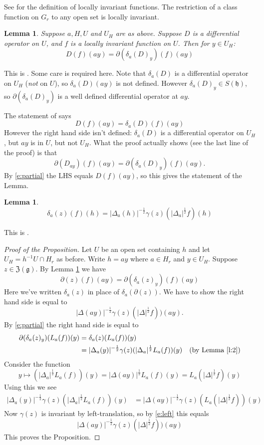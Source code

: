 \documentclass{article}
\newtheorem{lem}[thm]{Lemma}
\theoremstyle{definition}
\numberwithin{equation}{section}
\renewcommand{\-}{\hyp{}}
\newcommand{\inv}{^{-1}}
\newcommand{\z}{\mathfrak Z}
\newcommand{\g}{\mathfrak g}
\newcommand{\h}{\mathfrak h}
\begin{document}
See \cite[Section 8]{HC_inv_dist} for the definition of locally invariant functions.
The restriction of a class function on $G_r$ to any open set is locally invariant.

\begin{lem}
\label{l:1}
Suppose $a,H,U$ and $U_H$ are as above. 
Suppose $D$ is a differential operator on $U$, and $f$ is a locally invariant function on $U$.
Then for $y\in U_H$:
$$
D(f)(ay)=\partial(\delta_a(D)_y)(f)(ay)
$$
\end{lem}

This is \cite[Lemma 18]{HC_inv_eigen}. Some care is required here. Note that $\delta_a(D)$ is a differential operator on $U_H$ ({\it not} on $U$),
so $\delta_a(D)(ay)$ is not defined. However $\delta_a(D)_y\in S(\h)$,
so $\partial(\delta_a(D)_y)$ is a well defined differential operator at $ay$. 

The statement of \cite[Lemma 18]{HC_inv_eigen} says
$$
D(f)(ay)=\delta_a(D)(f)(ay)
$$
However the right hand side isn't defined: $\delta_a(D)$ is a differential operator on $U_H$, but $ay$ is in $U$, but not $U_H$.
What the proof actually shows (see the last line of the proof) is that 
$$
\partial(D_{ay})(f)(ay)=\partial(\delta_a(D)_y)(f)(ay).
$$
By \eqref{e:partial}
the LHS equals $D(f)(ay)$, so this gives the statement of the Lemma.


\begin{lem}
\label{l:2}
$$
\delta_a(z)(f)(h)=|\Delta_a(h)|^{-\frac12}\gamma(z)(|\Delta_a|^{\frac12}f)(h)
$$
\end{lem}
This is \cite[Lemma 13]{HC_inv_eigen}.

\begin{proof}[Proof of the Proposition]

Let $U$ be an open set containing $h$ and let $U_H=h\inv U\cap H_r$ as before. 
Write $h=ay$ where $a\in H_r$ and $y\in U_H$.
Suppose $z\in\z(\g)$. By  Lemma \ref{l:1} we have
$$
\partial(z)(f)(ay)=\partial(\delta_a(z)_y)(f)(ay)
$$
Here we've written $\delta_a(z)$ in place of $\delta_a(\partial(z))$.
We have to show the right hand side is equal to 
$$
|\Delta(ay)|^{-\frac12}\gamma(z)(|\Delta|^{\frac12}f))(ay).
$$
By \eqref{e:partial} the right hand side is equal to 
$$
\begin{aligned}
\partial(\delta_a(z)_y)(L_a(f))(y)&=\delta_a(z)(L_a(f))(y)\\
&=|\Delta_a(y)|^{-\frac12}\gamma(z)(|\Delta_a|^{\frac12}L_a(f))(y)\quad(\text{by Lemma \ref{l:2}})\\
\end{aligned}
$$
Consider the function
$$
y\mapsto(|\Delta_a|^{\frac12}L_a(f))(y)=|\Delta(ay)|^{\frac12}L_a(f)(y)=L_a(|\Delta|^{\frac12}f)(y)
$$
Using this we see
$$
\begin{aligned}
|\Delta_a(y)|^{-\frac12}\gamma(z)(|\Delta_a|^{\frac12}L_a(f))(y)&=
|\Delta(ay)|^{-\frac12}\gamma(z)(L_a(|\Delta|^{\frac12}f))(y)
\end{aligned}
$$
Now $\gamma(z)$ is invariant by left-translation, so by \eqref{e:left} this equals
$$
|\Delta(ay)|^{-\frac12}\gamma(z)(|\Delta|^{\frac12}f))(ay)
$$
This proves the Proposition.
\end{proof}





%

\end{document}
